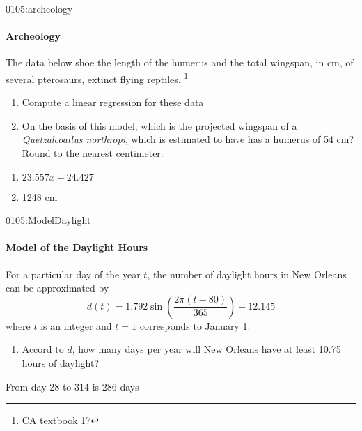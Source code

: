 \begin{defproblem}{0105:archeology}
\begin{onlyproblem}
\paragraph{Archeology}
The data below shoe the length of the
humerus and the total wingspan, in
cm, of several pterosaurs, extinct
flying reptiles.
\footnote{CA textbook 17}
\begin{enumerate}
\item Compute a linear regression for these data
\item On the basis of this model, which is the projected
wingspan of a \textit{Quetzalcoatlus northropi}, which is 
estimated to have has a humerus of 54 cm?  Round
to the nearest centimeter.
\end{enumerate}
\end{onlyproblem}
\begin{onlysolution}
\begin{enumerate}
\item $23.557x -24.427$
\item 1248 cm
\end{enumerate}
\end{onlysolution}
\end{defproblem}


\begin{defproblem}{0105:ModelDaylight}
\begin{onlyproblem}
\paragraph{Model of the Daylight Hours}
For a particular day of the year $t$, the number of 
daylight hours in New Orleans can be approximated
by
$$
d(t)=1.792\sin\left(\dfrac{2\pi(t-80)}{365}\right) + 12.145
$$
where $t$ is an integer and $t=1$ corresponds to
January 1.  
\begin{enumerate}
\item Accord to $d$, how many days per year will
New Orleans have at least 10.75 hours of daylight?
\end{enumerate}
\end{onlyproblem}
\begin{onlysolution}
From day 28 to 314 is 286 days
\end{onlysolution}
\end{defproblem}

